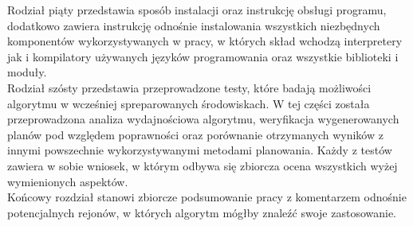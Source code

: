 	Rodział piąty przedstawia sposób instalacji oraz instrukcję obsługi programu, dodatkowo zawiera instrukcję odnośnie instalowania wszystkich
niezbędnych komponentów wykorzystywanych w pracy, w których skład wchodzą interpretery jak i kompilatory używanych języków programowania oraz 
wszystkie biblioteki i moduły.
\\

	Rodział szósty przedstawia przeprowadzone testy, które badają możliwości algorytmu w wcześniej spreparowanych środowiskach. W tej części została
przeprowadzona analiza wydajnościowa algorytmu, weryfikacja wygenerowanych planów pod względem poprawności oraz porównanie otrzymanych wyników
z innymi powszechnie wykorzystywanymi metodami planowania. Każdy z testów zawiera w sobie wniosek, w którym odbywa się zbiorcza
ocena wszystkich wyżej wymienionych aspektów.
\\

	Końcowy rozdział stanowi zbiorcze podsumowanie pracy z komentarzem odnośnie potencjalnych rejonów, w których algorytm mógłby znaleźć swoje
zastosowanie. 


